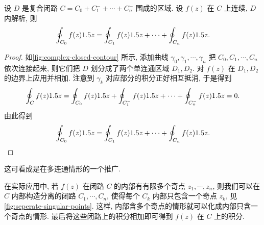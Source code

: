 \begin{theorem}[复合闭路定理]
  \label{thm:complex-closed-contour}
  设 $D$ 是复合闭路 $C=C_0+C_1^-+\cdots+C_n^-$ 围成的区域.
  设 $f(z)$ 在 $C$ 上连续, $D$ 内解析, 则
  \[
     \oint_{C_0}f(z)1.5 z
    =\oint_{C_1}f(z)1.5 z+\cdots+\oint_{C_n}f(z)1.5 z.
  \]
\end{theorem}

\begin{proof}
  如\ref{fig:complex-closed-contour} 所示, 添加曲线 $\gamma_0,\gamma_1,\cdots,\gamma_n$ 把 $C_0,C_1,\cdots,C_n$ 依次连接起来, 则它们把 $D$ 划分成了两个单连通区域 $D_1,D_2$.
  对 $f(z)$ 在 $D_1,D_2$ 的边界上应用\thmCG 并相加.
  注意到 $\gamma_k$ 对应部分的积分正好相互抵消, 于是得到
  \[
     \oint_C f(z)1.5 z
    =\oint_{C_0}f(z)1.5 z+\oint_{C_1^-}f(z)1.5 z
      +\cdots+\oint_{C_n^-}f(z)1.5 z
    =0.
  \]
  由此得到
  \[
     \oint_{C_0}f(z)1.5 z
    =\oint_{C_1}f(z)1.5 z+\cdots+\oint_{C_n}f(z)1.5 z.
  \]
\end{proof}

这可看成是\thmCG 在多连通情形的一个推广.

在实际应用中, 若 $f(z)$ 在闭路 $C$ 的内部有有限多个奇点 $z_1,\cdots,z_n$, 则我们可以在 $C$ 内部构造分离的闭路 $C_1,\cdots,C_n$, 使得每个 $C_k$ 内部只包含一个奇点 $z_k$, 见\ref{fig:seperate-singular-points}.
这样, 内部含多个奇点的情形就可以化成内部只含一个奇点的情形.
最后将这些闭路上的积分相加即可得到 $f(z)$ 在 $C$ 上的积分.

